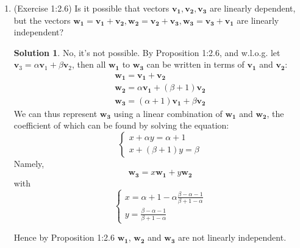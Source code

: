 \documentclass[]{book}
\theoremstyle{definition}
\newtheorem*{soln}{Solution}
\newcommand{\0}{\mathbf{0}}
\begin{document}
\begin{enumerate}
\item (Exercise 1:2.6)
Is it possible that vectors $\mathbf{v_1},\mathbf{v_2},\mathbf{v_3}$ are linearly dependent, but the vectors $\mathbf{w_1}=\mathbf{v_1}+\mathbf{v_2},\mathbf{w_2}=\mathbf{v_2}+\mathbf{v_3},\mathbf{w_3}=\mathbf{v_3}+\mathbf{v_1}$ are linearly independent?
\begin{soln}
No, it's not possible. By Proposition 1:2.6, and w.l.o.g. let $\mathbf{v}_3=\alpha\mathbf{v}_1+\beta\mathbf{v}_2$, then all $\mathbf{w_1}$ to $\mathbf{w_3}$ can be written in terms of $\mathbf{v_1}$ and $\mathbf{v_2}$:
\begin{gather*}
    \mathbf{w_1}=\mathbf{v_1}+\mathbf{v_2} \\
    \mathbf{w_2}=\alpha\mathbf{v_1}+(\beta+1)\mathbf{v_2} \\
    \mathbf{w_3}=(\alpha+1)\mathbf{v_1}+\beta\mathbf{v_2}
\end{gather*}
We can thus represent $\mathbf{w_3}$ using a linear combination of $\mathbf{w_1}$ and $\mathbf{w_2}$, the coefficient of which can be found by solving the equation:
$$\begin{cases} x + \alpha y=\alpha+1 \\ x+(\beta+1)y=\beta\end{cases}$$
Namely,
\[
\mathbf{w_3}=x\mathbf{w_1}+y\mathbf{w_2}
\]
with $$\begin{cases} x=\alpha+1-\alpha\frac{\beta-\alpha-1}{\beta+1-\alpha} \\ y=\frac{\beta-\alpha-1}{\beta+1-\alpha}\end{cases}$$
\end{soln}
Hence by Proposition 1:2.6 $\mathbf{w_1}$, $\mathbf{w_2}$ and $\mathbf{w_3}$ are not linearly independent.
\end{enumerate}
\end{document}
